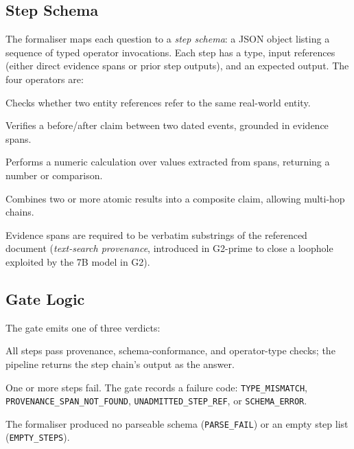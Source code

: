 \documentclass[11pt]{article}
\begin{document}
\subsection{Step Schema}

The formaliser maps each question to a \emph{step schema}: a JSON object
listing a sequence of typed operator invocations.  Each step has a type,
input references (either direct evidence spans or prior step outputs), and
an expected output.  The four operators are:

\begin{description}[leftmargin=*,noitemsep]
  \item[\texttt{entity\_equal}] Checks whether two entity references refer
    to the same real-world entity.
  \item[\texttt{temporal\_order}] Verifies a before/after claim between
    two dated events, grounded in evidence spans.
  \item[\texttt{arithmetic}] Performs a numeric calculation over values
    extracted from spans, returning a number or comparison.
  \item[\texttt{conjoin}] Combines two or more atomic results into a
    composite claim, allowing multi-hop chains.
\end{description}

Evidence spans are required to be verbatim substrings of the referenced
document (\emph{text-search provenance}, introduced in G2-prime to close a
loophole exploited by the 7B model in G2).

\subsection{Gate Logic}

The gate emits one of three verdicts:

\begin{description}[leftmargin=*,noitemsep]
  \item[\textsc{admit}] All steps pass provenance, schema-conformance, and
    operator-type checks; the pipeline returns the step chain's output as the
    answer.
  \item[\textsc{reject}] One or more steps fail.  The gate records a failure
    code: \texttt{TYPE\_MISMATCH}, \texttt{PROVENANCE\_SPAN\_NOT\_FOUND},
    \texttt{UNADMITTED\_STEP\_REF}, or \texttt{SCHEMA\_ERROR}.
  \item[\textsc{abstain}] The formaliser produced no parseable schema
    (\texttt{PARSE\_FAIL}) or an empty step list (\texttt{EMPTY\_STEPS}).
\end{description}
\end{document}

